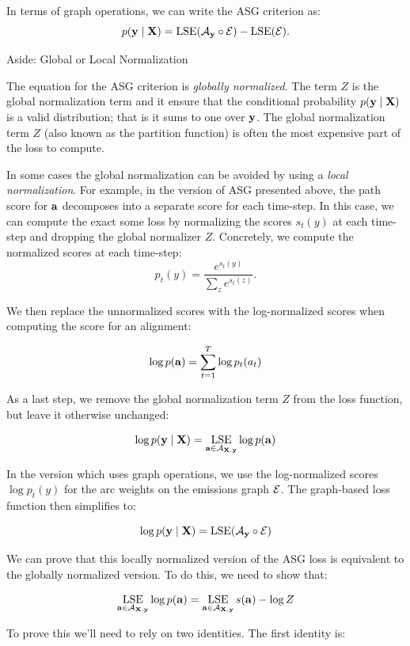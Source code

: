 In terms of graph operations, we can write the ASG criterion as:
\begin{equation}
    \label{eq:asg_graph_loss}
    p({\bf y} \mid {\bf X}) = \operatorname*{\textrm{LSE}}(\mathcal{A}_{\bf y} \circ \mathcal{E}) - \operatorname*{\textrm{LSE}}(\mathcal{E}).
\end{equation}

Aside: Global or Local Normalization

The equation for the ASG criterion is \emph{globally normalized}. The term $Z$
is the global normalization term and it ensure that the conditional probability
$p({\bf y} \mid {\bf X})$ is a valid distribution; that is it sums to one over ${\bf y}$.
The global normalization term $Z$ (also known as the partition function) is
often the most expensive part of the loss to compute.

In some cases the global normalization can be avoided by using a \emph{local
normalization}. For example, in the version of ASG presented above, the path
score for ${\bf a}$ decomposes into a separate score for each time-step. In this
case, we can compute the exact some loss by normalizing the scores $s_t(y)$ at
each time-step and dropping the global normalizer $Z$. Concretely, we compute
the normalized scores at each time-step:
$$
p_t(y) = \frac{e^{s_t(y)}}{\sum_z e^{s_t(z)}}.
$$

We then replace the unnormalized scores with the log-normalized scores when
computing the score for an alignment:

$$
\log p({\bf a}) = \sum_{t=1}^T \log p_t(a_t)
$$

As a last step, we remove the global normalization term $Z$ from the loss
function, but leave it otherwise unchanged:

$$
\log p({\bf y} \mid {\bf X}) = \operatorname*{\textrm{LSE}}_{{\bf a} \in \mathcal{A}_{{\bf X}, {\bf y}}} \log p({\bf a})
$$

In the version which uses graph operations, we use the log-normalized scores
$\log p_t(y)$ for the arc weights on the emissions graph $\mathcal{E}$. The graph-based
loss function then simplifies to:

$$
\log p({\bf y} \mid {\bf X}) = \operatorname*{\textrm{LSE}}(\mathcal{A}_{\bf y} \circ \mathcal{E})
$$

We can prove that this locally normalized version of the ASG loss is equivalent
to the globally normalized version. To do this, we need to show that:

$$
\operatorname*{\textrm{LSE}}_{{\bf a} \in \mathcal{A}_{{\bf X}, {\bf y}}} \log p({\bf a}) = \operatorname*{\textrm{LSE}}_{{\bf a} \in \mathcal{A}_{{\bf X}, {\bf y}}} s({\bf a}) - \log Z
$$

To prove this we'll need to rely on two identities. The first identity is:

